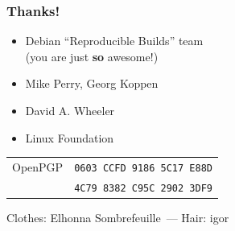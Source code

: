 \documentclass[14pt,ignorenonframetext]{beamer}
\begin{document}
\begin{frame}
 \frametitle{Thanks!}

 \begin{itemize}
  \item Debian “Reproducible Builds” team \\
    {\small (you are just \textbf{so} awesome!)}
  \item Mike Perry, Georg Koppen
  \item David A. Wheeler
  \item Linux Foundation
 \end{itemize}

 \begin{center}
  \begin{tabular}{rl}
   OpenPGP & \texttt{0603 CCFD 9186 5C17 E88D} \\
           & \texttt{4C79 8382 C95C 2902 3DF9}
  \end{tabular}

 \begin{center}\small
  Clothes: Elhonna Sombrefeuille — Hair: igor
 \end{center}

 \end{center}
\end{frame}
\end{document}
